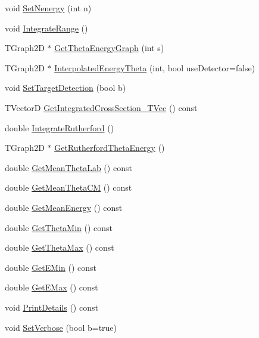 \begin{DoxyCompactItemize}
void \hyperlink{classExperimentRange_a84cd068a026d0ab30ac0612aee68f74b}{Set\-Nenergy} (int n)
\item 
void \hyperlink{classExperimentRange_afbbbb4137620aa9ce50c2a42c7b7ed5d}{Integrate\-Range} ()
\item 
T\-Graph2\-D $\ast$ \hyperlink{classExperimentRange_a047d78a553fbfbaf8d7a840ecdbbb03e}{Get\-Theta\-Energy\-Graph} (int s)
\item 
T\-Graph2\-D $\ast$ \hyperlink{classExperimentRange_a7814ead31c329c275f928dbf97d7b68b}{Interpolated\-Energy\-Theta} (int, bool use\-Detector=false)
\item 
void \hyperlink{classExperimentRange_ac5170826c6f6d9bae33364bf06de6ba1}{Set\-Target\-Detection} (bool b)
\item 
T\-Vector\-D \hyperlink{classExperimentRange_aeaae632ca1999c91a60003501a302de6}{Get\-Integrated\-Cross\-Section\-\_\-\-T\-Vec} () const 
\item 
double \hyperlink{classExperimentRange_af75dd0bb5ca1f09b00009409edbf82cb}{Integrate\-Rutherford} ()
\item 
T\-Graph2\-D $\ast$ \hyperlink{classExperimentRange_a5c660c8ac6f863d179ca2d465a0eaa3e}{Get\-Rutherford\-Theta\-Energy} ()
\item 
double \hyperlink{classExperimentRange_afa45529cc4c2f50064385a1c36c07ceb}{Get\-Mean\-Theta\-Lab} () const 
\item 
double \hyperlink{classExperimentRange_a2418fc250e4e8de383cdb6eb8aec4331}{Get\-Mean\-Theta\-C\-M} () const 
\item 
double \hyperlink{classExperimentRange_af2ac4cda863fc12f646a1e570d1328cd}{Get\-Mean\-Energy} () const 
\item 
double \hyperlink{classExperimentRange_a5ddd63cb813e69d51ae0a4cba3798011}{Get\-Theta\-Min} () const 
\item 
double \hyperlink{classExperimentRange_a93a9a3a0216f1abfb874b404e4c13601}{Get\-Theta\-Max} () const 
\item 
double \hyperlink{classExperimentRange_ac1da7f718e6f895639d1617f44a40ec0}{Get\-E\-Min} () const 
\item 
double \hyperlink{classExperimentRange_af06d3d2a7d54cd09ee413c1b7f54e74e}{Get\-E\-Max} () const 
\item 
void \hyperlink{classExperimentRange_a78aeaf6af38c928af3c390d0dbd23cd2}{Print\-Details} () const 
\item 
void \hyperlink{classExperimentRange_a95d3a225080af35191f59fe518bdb10f}{Set\-Verbose} (bool b=true)
\item 

\end{DoxyCompactItemize}
